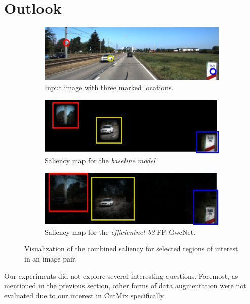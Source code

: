 \documentclass[runningheads]{llncs}
\begin{document}
\section{Outlook}
\begin{figure}[h]
     \centering
     \begin{subfigure}[h]{0.32\linewidth}
         \centering
        \includegraphics[width=\linewidth]{images/saliency_reference.png}
        \caption{Input image with three marked locations.}
     \end{subfigure}
     \hfill
     \begin{subfigure}[h]{0.32\linewidth}
         \centering
        \includegraphics[width=\linewidth]{images/saliency_annotated_baseline.png}
        \caption{Saliency map for the \textit{baseline model}.}
     \end{subfigure}
     \hfill
     \begin{subfigure}[h]{0.32\linewidth}
         \centering
        \includegraphics[width=\linewidth]{images/saliency_annotated_efficientnet-b3.png}
        \caption{Saliency map for the \textit{efficientnet-b3} FF-GwcNet.}
     \end{subfigure}
     \caption{Visualization of the combined saliency for selected regions of interest in an image pair.\label{Fig:Saliency}}
\end{figure}
Our experiments did not explore several interesting questions. Foremost, as mentioned in the previous section, other forms of data augmentation were not evaluated due to our interest in CutMix specifically.
\end{document}
